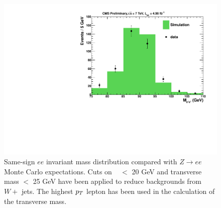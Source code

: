 \begin{figure}[h]
\begin{center}
\includegraphics[width=0.8\linewidth]{figs/qflip_data_mc_comp}
\caption{\label{fig:flipZee}
Same-sign $ee$ invariant mass distribution compared with $Z \to ee$ Monte Carlo expectations.
Cuts on \met~ $<$ 20 GeV and transverse mass
$<$ 25 GeV have been applied to reduce backgrounds from $W +$ jets.
The highest $p_T$ lepton has been used in the calculation of the transverse  mass.}
\end{center}
\end{figure}


